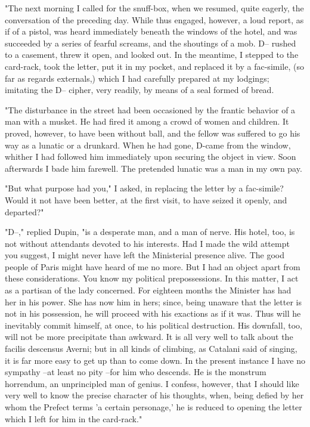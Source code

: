 \documentclass{article}
\begin{document}
"The next morning I called for the snuff-box, when we resumed, quite eagerly, the conversation of the preceding day. While thus engaged, however, a loud report, as if of a pistol, was heard immediately beneath the windows of the hotel, and was succeeded by a series of fearful screams, and the shoutings of a mob. D-- rushed to a casement, threw it open, and looked out. In the meantime, I stepped to the card-rack, took the letter, put it in my pocket, and replaced it by a fac-simile, (so far as regards externals,) which I had carefully prepared at my lodgings; imitating the D-- cipher, very readily, by means of a seal formed of bread.

"The disturbance in the street had been occasioned by the frantic behavior of a man with a musket. He had fired it among a crowd of women and children. It proved, however, to have been without ball, and the fellow was suffered to go his way as a lunatic or a drunkard. When he had gone, D-came from the window, whither I had followed him immediately upon securing the object in view. Soon afterwards I bade him farewell. The pretended lunatic was a man in my own pay.

"But what purpose had you," I asked, in replacing the letter by a fac-simile? Would it not have been better, at the first visit, to have seized it openly, and departed?"

"D--," replied Dupin, "is a desperate man, and a man of nerve. His hotel, too, is not without attendants devoted to his interests. Had I made the wild attempt you suggest, I might never have left the Ministerial presence alive. The good people of Paris might have heard of me no more. But I had an object apart from these considerations. You know my political prepossessions. In this matter, I act as a partisan of the lady concerned. For eighteen months the Minister has had her in his power. She has now him in hers; since, being unaware that the letter is not in his possession, he will proceed with his exactions as if it was. Thus will he inevitably commit himself, at once, to his political destruction. His downfall, too, will not be more precipitate than awkward. It is all very well to talk about the facilis descensus Averni; but in all kinds of climbing, as Catalani said of singing, it is far more easy to get up than to come down. In the present instance I have no sympathy --at least no pity --for him who descends. He is the monstrum horrendum, an unprincipled man of genius. I confess, however, that I should like very well to know the precise character of his thoughts, when, being defied by her whom the Prefect terms 'a certain personage,' he is reduced to opening the letter which I left for him in the card-rack."
\end{document}
